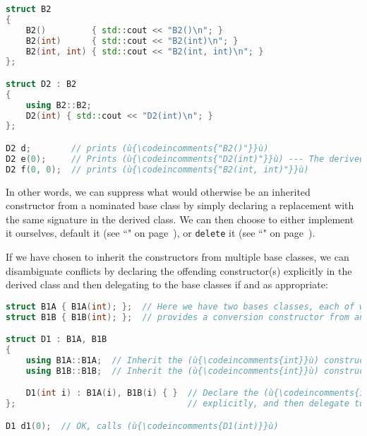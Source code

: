 \begin{lstlisting}[language=C++]
struct B2
{
    B2()         { std::cout << "B2()\n"; }
    B2(int)      { std::cout << "B2(int)\n"; }
    B2(int, int) { std::cout << "B2(int, int)\n"; }
};

struct D2 : B2
{
    using B2::B2;
    D2(int) { std::cout << "D2(int)\n"; }
};

D2 d;        // prints (ù{\codeincomments{"B2()"}}ù)
D2 e(0);     // Prints (ù{\codeincomments{"D2(int)"}}ù) --- The derived constructor is invoked.
D2 f(0, 0);  // prints (ù{\codeincomments{"B2(int, int)"}}ù)
\end{lstlisting}
    
\noindent In other words, we can suppress what would otherwise be an inherited
constructor from a nominated base class by simply declaring a
replacement with the same signature in the derived class. We can then
choose to either implement it ourselves, default it (see ``" on page~\pageref{defaulted-special-member-functions}), or \texttt{delete} it (see ``" on page~\pageref{deleted-functions}).

If we have chosen to inherit the constructors from multiple
base classes, we can disambiguate conflicts by declaring the offending
constructor(s) explicitly in the derived class and then delegating to
the base classes if and as appropriate:

\begin{lstlisting}[language=C++]
struct B1A { B1A(int); };  // Here we have two bases classes, each of which
struct B1B { B1B(int); };  // provides a conversion constructor from an (ù{\codeincomments{int}}ù).

struct D1 : B1A, B1B
{
    using B1A::B1A;  // Inherit the (ù{\codeincomments{int}}ù) constructor from base class (ù{\codeincomments{B1A}}ù).
    using B1B::B1B;  // Inherit the (ù{\codeincomments{int}}ù) constructor from base class (ù{\codeincomments{B1B}}ù).

    D1(int i) : B1A(i), B1B(i) { }  // Declare the (ù{\codeincomments{int}}ù) conversion constructor
};                                  // explicitly, and then delegate to bases.

D1 d1(0);  // OK, calls (ù{\codeincomments{D1(int)}}ù)
\end{lstlisting}
    
